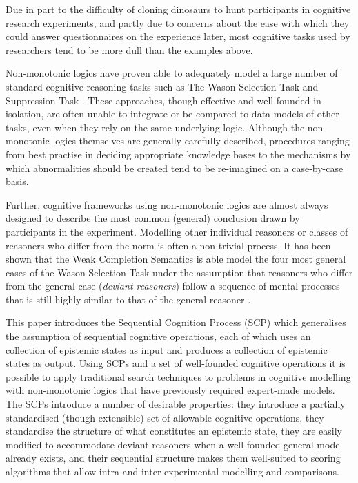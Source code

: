 \documentclass{article}
\begin{document}
Due in part to the difficulty of cloning dinosaurs to hunt participants in cognitive research experiments, and partly due to concerns about the ease with which they could answer questionnaires on the experience later, most cognitive tasks used by researchers tend to be more dull than the examples above.

Non-monotonic logics have proven able to adequately model a large number of standard cognitive reasoning tasks such as The Wason Selection Task\citep{wason1968reasoning} and Suppression Task \citep{byrne1989suppressing}. These approaches, though effective and well-founded in isolation, are often unable to integrate or be compared to data models of other tasks, even when they rely on the same underlying logic. Although the non-monotonic logics themselves are generally carefully described, procedures ranging from best practise in deciding appropriate knowledge bases to the mechanisms by which abnormalities should be created tend to be re-imagined on a case-by-case basis.

Further, cognitive frameworks using non-monotonic logics are almost always designed to describe the most common (general) conclusion drawn by participants in the experiment. Modelling other individual reasoners or classes of reasoners who differ from the norm is often a non-trivial process. It has been shown that the Weak Completion Semantics \citep{holldobler2015weak} is able model the four most general cases of the Wason Selection Task under the assumption that reasoners who differ from the general case (\textit{deviant reasoners}) follow a sequence of mental processes that is still highly similar to that of the general reasoner \citep{breu2019weak}.

This paper introduces the Sequential Cognition Process (SCP) which generalises the assumption of sequential cognitive operations, each of which uses an collection of epistemic states as input and produces a collection of epistemic states as output. Using SCPs and a set of well-founded cognitive operations it is possible to apply traditional search techniques to problems in cognitive modelling with non-monotonic logics that have previously required expert-made models. The SCPs introduce a number of desirable properties: they introduce a partially standardised (though extensible) set of allowable cognitive operations, they standardise the structure of what constitutes an epistemic state, they are easily modified to accommodate deviant reasoners when a well-founded general model already exists, and their sequential structure makes them well-suited to scoring algorithms that allow intra and inter-experimental modelling and comparisons.
\end{document}
